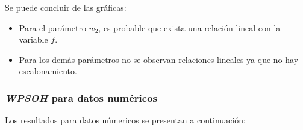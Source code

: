     Se puede concluir de las gráficas:
\begin{itemize}
    \item Para el parámetro $w_2$, es probable que exista una
relación lineal con la variable $f$.
    \item Para los demás parámetros no se observan relaciones
lineales ya que no hay escalonamiento.
\end{itemize}

\subsubsection{\emph{WPSOH} para datos numéricos}

    Los resultados para datos númericos se presentan a continuación:

\begin{figure}[H]
  \centering
  \label{fig:f_wpso_csv1}
\end{figure}

